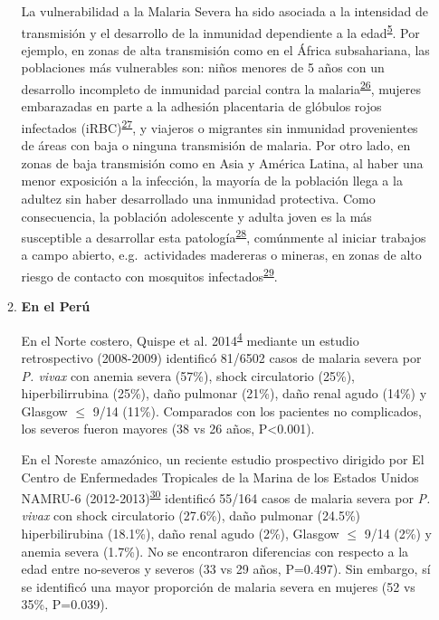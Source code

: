 \documentclass[a4paper]{article}
\begin{document}
\begin{enumerate}
\begin{enumerate}
    La vulnerabilidad a la Malaria Severa ha sido asociada a la
    intensidad de transmisión y el desarrollo de la inmunidad
    dependiente a la
    edad\textsuperscript{\protect\hyperlink{ref-reyburn2015}{5}}. Por
    ejemplo, en zonas de alta transmisión como en el África
    subsahariana, las poblaciones más vulnerables son: niños menores de
    5 años con un desarrollo incompleto de inmunidad parcial contra la
    malaria\textsuperscript{\protect\hyperlink{ref-Stanisic2015}{26}},
    mujeres embarazadas en parte a la adhesión placentaria de glóbulos
    rojos infectados
    (iRBC)\textsuperscript{\protect\hyperlink{ref-rogerson2007preg}{27}},
    y viajeros o migrantes sin inmunidad provenientes de áreas con baja
    o ninguna transmisión de malaria. Por otro lado, en zonas de baja
    transmisión como en Asia y América Latina, al haber una menor
    exposición a la infección, la mayoría de la población llega a la
    adultez sin haber desarrollado una inmunidad protectiva. Como
    consecuencia, la población adolescente y adulta joven es la más
    susceptible a desarrollar esta
    patología\textsuperscript{\protect\hyperlink{ref-llanoschea2015}{28}},
    comúnmente al iniciar trabajos a campo abierto, e.g.~actividades
    madereras o mineras, en zonas de alto riesgo de contacto con
    mosquitos
    infectados\textsuperscript{\protect\hyperlink{ref-factores2001}{29}}.
  \item
    \textbf{En el Perú}

    En el Norte costero, Quispe et al.
    2014\textsuperscript{\protect\hyperlink{ref-quispe2014}{4}} mediante
    un estudio retrospectivo (2008-2009) identificó 81/6502 casos de
    malaria severa por \emph{P. vivax} con anemia severa (57\%), shock
    circulatorio (25\%), hiperbilirrubina (25\%), daño pulmonar (21\%),
    daño renal agudo (14\%) y Glasgow \(\le\) 9/14 (11\%). Comparados
    con los pacientes no complicados, los severos fueron mayores (38 vs
    26 años, P\textless{}0.001).

    En el Noreste amazónico, un reciente estudio prospectivo dirigido
    por El Centro de Enfermedades Tropicales de la Marina de los Estados
    Unidos NAMRU-6
    (2012-2013)\textsuperscript{\protect\hyperlink{ref-smith2013}{30}}
    identificó 55/164 casos de malaria severa por \emph{P. vivax} con
    shock circulatorio (27.6\%), daño pulmonar (24.5\%) hiperbilirubina
    (18.1\%), daño renal agudo (2\%), Glasgow \(\le\) 9/14 (2\%) y
    anemia severa (1.7\%). No se encontraron diferencias con respecto a
    la edad entre no-severos y severos (33 vs 29 años, P=0.497). Sin
    embargo, sí se identificó una mayor proporción de malaria severa en
    mujeres (52 vs 35\%, P=0.039).
  \end{enumerate}
\end{enumerate}
\end{document}
